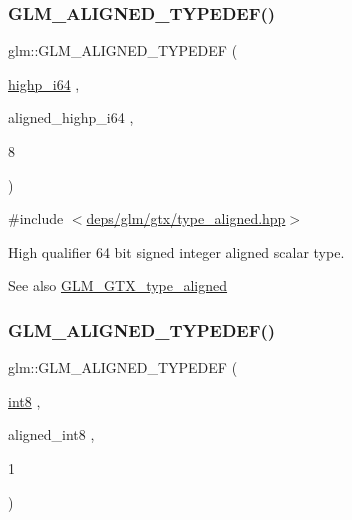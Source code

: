 \subsubsection{\texorpdfstring{G\+L\+M\+\_\+\+A\+L\+I\+G\+N\+E\+D\+\_\+\+T\+Y\+P\+E\+D\+E\+F()}{GLM\_ALIGNED\_TYPEDEF()}\hspace{0.1cm}{\footnotesize\ttfamily [36/209]}}
{\footnotesize\ttfamily glm\+::\+G\+L\+M\+\_\+\+A\+L\+I\+G\+N\+E\+D\+\_\+\+T\+Y\+P\+E\+D\+EF (\begin{DoxyParamCaption}\item[{\hyperlink{group__gtc__type__precision_gad3cb9a0ac0266ea2c51c6fac256345d1}{highp\+\_\+i64}}]{,  }\item[{aligned\+\_\+highp\+\_\+i64}]{,  }\item[{8}]{ }\end{DoxyParamCaption})}



{\ttfamily \#include $<$\hyperlink{gtx_2type__aligned_8hpp}{deps/glm/gtx/type\+\_\+aligned.\+hpp}$>$}

High qualifier 64 bit signed integer aligned scalar type. \begin{DoxySeeAlso}{See also}
\hyperlink{group__gtx__type__aligned}{G\+L\+M\+\_\+\+G\+T\+X\+\_\+type\+\_\+aligned} 
\end{DoxySeeAlso}
\mbox{\label{group__gtx__type__aligned_gabd82b9faa9d4d618dbbe0fc8a1efee63}} 
\subsubsection{\texorpdfstring{G\+L\+M\+\_\+\+A\+L\+I\+G\+N\+E\+D\+\_\+\+T\+Y\+P\+E\+D\+E\+F()}{GLM\_ALIGNED\_TYPEDEF()}\hspace{0.1cm}{\footnotesize\ttfamily [37/209]}}
{\footnotesize\ttfamily glm\+::\+G\+L\+M\+\_\+\+A\+L\+I\+G\+N\+E\+D\+\_\+\+T\+Y\+P\+E\+D\+EF (\begin{DoxyParamCaption}\item[{\hyperlink{group__gtc__type__precision_ga96254f9c1c4506fc8eb5cf3301ce8565}{int8}}]{,  }\item[{aligned\+\_\+int8}]{,  }\item[{1}]{ }\end{DoxyParamCaption})}




